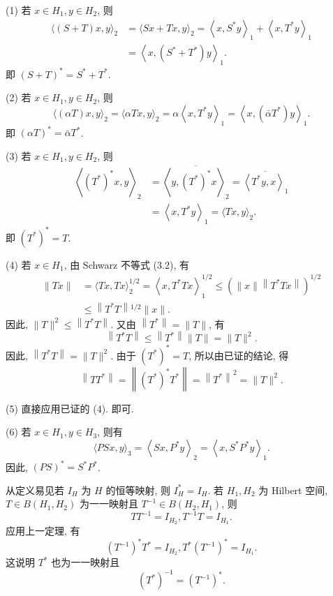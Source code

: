 \documentclass[openany]{ctexbook}
\makeatletter
\theoremstyle{kaiti}
\theoremstyle{normal}
\renewenvironment{proof}[1][\proofname]{\par
    \pushQED{\qed}%
    \normalfont \topsep6\p@\@plus6\p@\relax
    \trivlist
    \item\relax
    {\heiti #1}\hspace{2\labelsep}\ignorespaces
  }{%
    \popQED\endtrivlist\@endpefalse
  }
\makeatother
\begin{document}
\begin{proof}
(1) 若 $x \in H_1, y \in H_2$, 则
$$
\begin{aligned}
\langle(S+T) x, y\rangle_2 &=\langle S x+T x, y\rangle_2=\left\langle x, S^{*} y\right\rangle_1+\left\langle x, T^{*} y\right\rangle_1 \\
&=\left\langle x,\left(S^{*}+T^{*}\right) y\right\rangle_1.
\end{aligned}
$$
即 $(S+T)^{*}=S^{*}+T^{*}$.

(2) 若 $x \in H_1, y \in H_2$, 则
$$
\langle(\alpha T) x, y\rangle_2=\langle\alpha T x, y\rangle_2=\alpha\left\langle x, T^{*} y\right\rangle_1=\left\langle x,\left(\bar{\alpha} T^{*}\right) y\right\rangle_1.
$$
即 $(\alpha T)^{*}=\bar{\alpha} T^{*}$.

(3) 若 $x \in H_1, y \in H_2$, 则
$$
\begin{aligned}
\left\langle\left(T^{*}\right)^{*} x, y\right\rangle_2 &=\overline{\left\langle y,\left(T^{*}\right)^{*} x\right\rangle_2}=\overline{\left\langle T^{*} y, x\right\rangle_1} \\
&=\left\langle x, T^{*} y\right\rangle_1=\langle T x, y\rangle_2.
\end{aligned}
$$
即 $\left(T^{*}\right)^{*}=T$.

(4) 若 $x \in H_1$, 由 Schwarz 不等式 (3.2), 有
$$
\begin{aligned}
\|T x\| &=\langle T x, T x\rangle_2^{1 / 2}=\left\langle x, T^{*} T x\right\rangle_1^{1 / 2} \leqslant\left(\|x\|\left\|T^{*} T x\right\|\right)^{1 / 2} \\
& \leqslant\left\|T^{*} T\right\|{ }^{1 / 2}\|x\|.
\end{aligned}
$$
因此, $\|T\|^2 \leqslant\left\|T^{*} T\right\|$. 又由 $\left\|T^{*}\right\|=\|T\|$, 有
$$
\left\|T^{*} T\right\| \leqslant\left\|T^{*}\right\|\|T\|=\|T\|^2.
$$
因此, $\left\|T^{*} T\right\|=\|T\|^2$.
由于 $\left(T^{*}\right)^{*}=T$, 所以由已证的结论, 得
$$
\left\|T T^{*}\right\|=\left\|\left(T^{*}\right)^{*} T^{*}\right\|=\left\|T^{*}\right\|^2=\|T\|^2.
$$

(5) 直接应用已证的 (4). 即可.

(6) 若 $x \in H_1, y \in H_3$, 则有
$$
\langle P S x, y\rangle_3=\left\langle S x, P^{*} y\right\rangle_2=\left\langle x, S^{*} P^{*} y\right\rangle_1.
$$
因此, $(P S)^{*}=S^{*} P^{*}$.
\end{proof}

从定义易见若 $I_{H}$ 为 $H$ 的恒等映射, 则 $I_{H}^{*}=I_{H}$. 若 $H_1, H_2$ 为 Hilbert 空间, $T \in B\left(H_1, H_2\right)$ 为一一映射且 $T^{-1} \in B\left(H_2, H_1\right)$, 则
$$
T T^{-1}=I_{H_2}, T^{-1} T=I_{H_1}.
$$
应用上一定理, 有
$$
\left(T^{-1}\right)^{*} T^{*}=I_{H_2}, T^{*}\left(T^{-1}\right)^{*}=I_{H_1}.
$$
这说明 $T^{*}$ 也为一一映射且
$$
\left(T^{*}\right)^{-1}=\left(T^{-1}\right)^{*}.
$$
\end{document}
